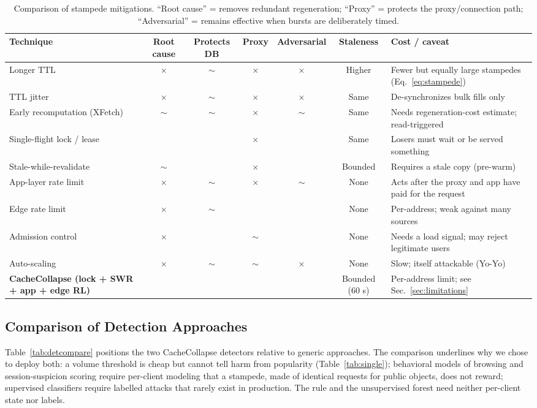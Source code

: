 \documentclass[preprint,12pt]{elsarticle}
\newcommand{\yes}{\checkmark}
\newcommand{\no}{$\times$}
\newcommand{\prt}{$\sim$}
\begin{document}
\begin{table}[t]
\centering
\caption{Comparison of stampede mitigations. ``Root cause'' = removes redundant
regeneration; ``Proxy'' = protects the proxy/connection path; ``Adversarial'' = remains
effective when bursts are deliberately timed.}
\label{tab:mitigations}
\footnotesize
\begin{tabularx}{\linewidth}{@{}L{3.1cm}cccccY@{}}
\toprule
Technique & Root cause & Protects DB & Proxy & Adversarial & Staleness & Cost / caveat \\
\midrule
Longer TTL & \no & \prt & \no & \no & Higher & Fewer but equally large stampedes (Eq.~\ref{eq:stampede}) \\
TTL jitter & \no & \prt & \no & \no & Same & De-synchronizes bulk fills only \\
Early recomputation (XFetch) \cite{vattani2015} & \prt & \prt & \no & \prt & Same & Needs regeneration-cost estimate; read-triggered \\
Single-flight lock / lease \cite{nishtala2013,singleflight} & \yes & \yes & \no & \yes & Same & Losers must wait or be served something \\
Stale-while-revalidate \cite{rfc5861} & \prt & \yes & \no & \yes & Bounded & Requires a stale copy (pre-warm) \\
App-layer rate limit & \no & \prt & \no & \prt & None & Acts after the proxy and app have paid for the request \\
Edge rate limit \cite{nginxlimitreq} & \no & \prt & \yes & \yes & None & Per-address; weak against many sources \\
Admission control \cite{welsh2003,cherkasova2002} & \no & \yes & \prt & \yes & None & Needs a load signal; may reject legitimate users \\
Auto-scaling & \no & \prt & \prt & \no & None & Slow; itself attackable (Yo-Yo) \cite{sides2016} \\
\textbf{CacheCollapse (lock + SWR + app + edge RL)} & \yes & \yes & \yes & \yes & Bounded (60 s) & Per-address limit; see Sec.~\ref{sec:limitations} \\
\bottomrule
\end{tabularx}
\end{table}

\subsection{Comparison of Detection Approaches}
Table~\ref{tab:detcompare} positions the two CacheCollapse detectors relative to
generic approaches. The comparison underlines why we chose to deploy both: a
volume threshold is cheap but cannot tell harm from popularity
(Table~\ref{tab:single}); behavioral models of browsing \cite{xie2009} and
session-suspicion scoring \cite{ranjan2009} require per-client modeling that a
stampede, made of identical requests for public objects, does not reward; supervised
classifiers require labelled attacks that rarely exist in production. The rule and
the unsupervised forest need neither per-client state nor labels.
\end{document}
